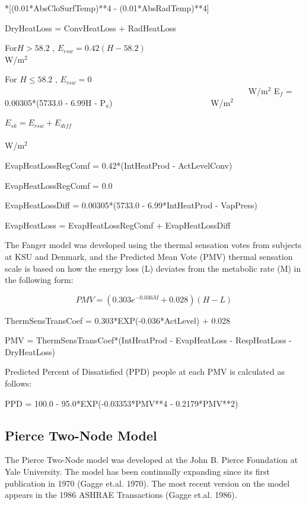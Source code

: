 *{[}(0.01*AbsCloSurfTemp)**4 - (0.01*AbsRadTemp)**4{]}

DryHeatLoss = ConvHeatLoss + RadHeatLoss

For\(H > 58.2\) , \({E_{rsw}} = 0.42(H - 58.2)\) ~~~~~~~~~~~~~~~~~~~~~~~~~~~~~~~~~~~~~ W/m\(^{2}\)

For \(H \le 58.2\) , \({E_{rsw}} = 0\) ~~~~~~~~~~~~~~~~~~~~~~~~~~~~~~~~~~~~~~~~~~~~~~~~~~~~~~~~~~ W/m\(^{2}\) {E\(_{f}\) = 0.00305*(5733.0 - 6.99H - P\(_{a}\))}~~~~~~~~~~~~~~~~~~~~~~~ W/m\(^{2}\)

\({E_{sk}} = {E_{rsw}} + {E_{diff}}\) ~~~~~~~~~~~~~~~~~~~~~~~~~~~~~~~~~~~~~~~~~~~~~~~~~~~~~~~~~~~~~~~~~~~~~ W/m\(^{2}\)

EvapHeatLossRegComf = 0.42*(IntHeatProd - ActLevelConv)

EvapHeatLossRegComf = 0.0

EvapHeatLossDiff = 0.00305*(5733.0 - 6.99*IntHeatProd - VapPress)

EvapHeatLoss = EvapHeatLossRegComf + EvapHeatLossDiff

The Fanger model was developed using the thermal sensation votes from subjects at KSU and Denmark, and the Predicted Mean Vote (PMV) thermal sensation scale is based on how the energy loss (L) deviates from the metabolic rate (M) in the following form:

\begin{equation}
PMV = (0.303{e^{ - 0.036M}} + 0.028)(H - L)
\end{equation}

ThermSensTransCoef = 0.303*EXP(-0.036*ActLevel) + 0.028

PMV = ThermSensTransCoef*(IntHeatProd - EvapHeatLoss - RespHeatLoss - DryHeatLoss)

Predicted Percent of Dissatisfied (PPD) people at each PMV is calculated as follows:

PPD = 100.0 - 95.0*EXP(-0.03353*PMV**4 - 0.2179*PMV**2)

\subsection{Pierce Two-Node Model}\label{pierce-two-node-model}

The Pierce Two-Node model was developed at the John B. Pierce Foundation at Yale University. The model has been continually expanding since its first publication in 1970 (Gagge et.al. 1970). The most recent version on the model appears in the 1986 ASHRAE Transactions (Gagge et.al. 1986).

